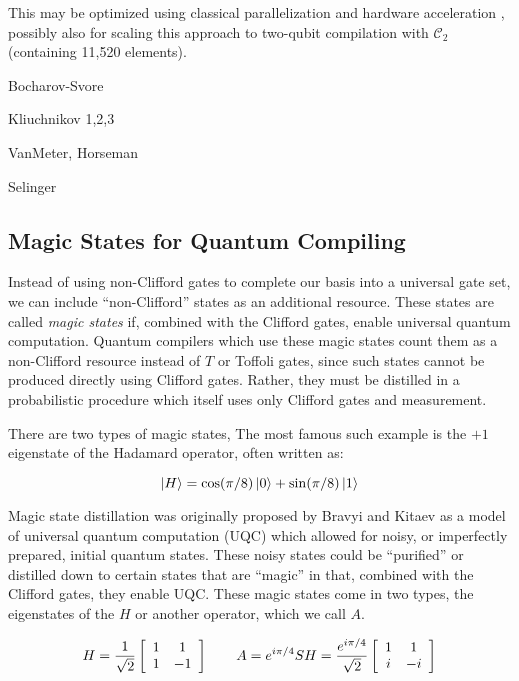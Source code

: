 This may be optimized using classical parallelization and hardware acceleration
\cite{Booth2012}, possibly also for scaling this approach to
two-qubit compilation with $\mathcal{C}_2$ (containing 11,520
elements).



Bocharov-Svore

Kliuchnikov 1,2,3

VanMeter, Horseman

Selinger

\subsection{Magic States for Quantum Compiling}

Instead of using non-Clifford gates to complete our basis into a universal
gate set, we can include ``non-Clifford'' states as an additional resource.
These states are called \emph{magic states} if, combined with the Clifford
gates, enable universal quantum computation.
Quantum compilers which use these magic states count them as a non-Clifford
resource instead of $T$ or Toffoli gates, since such states cannot
be produced directly using Clifford gates. Rather, they must be
distilled in a probabilistic procedure which itself uses only 
Clifford gates and measurement.

There are two types of magic states, 
The most famous such example is the $+1$ eigenstate of the Hadamard operator,
often written as:

\begin{equation}
\left\vert{H}\right\rangle = \cos(\pi/8)\left\vert{0}\right\rangle + \sin(\pi/8)\left\vert{1}\right\rangle
\end{equation}

Magic state distillation was originally proposed by Bravyi and Kitaev
\cite{Bravyi2005} as a model of universal quantum computation (UQC) which
allowed for noisy, or imperfectly prepared, initial quantum states. These
noisy states could be ``purified'' or distilled down to certain states
that are ``magic'' in that, combined with the Clifford gates, they enable
UQC. These magic states come in two types, the eigenstates
of the $H$ or another operator, which we call $A$.

\begin{equation}
H = 
\frac{1}{\sqrt{2}}
\left[ \begin{array}{cc}
1 & 1\\
1 & -1
\end{array} \right]
\qquad
A = e^{i\pi / 4} SH = \frac{e^{i\pi/4}}{\sqrt{2}}
\left[ \begin{array}{cc}
1 & 1\\
i & -i
\end{array} \right]
\label{eqn:T}
\end{equation}

